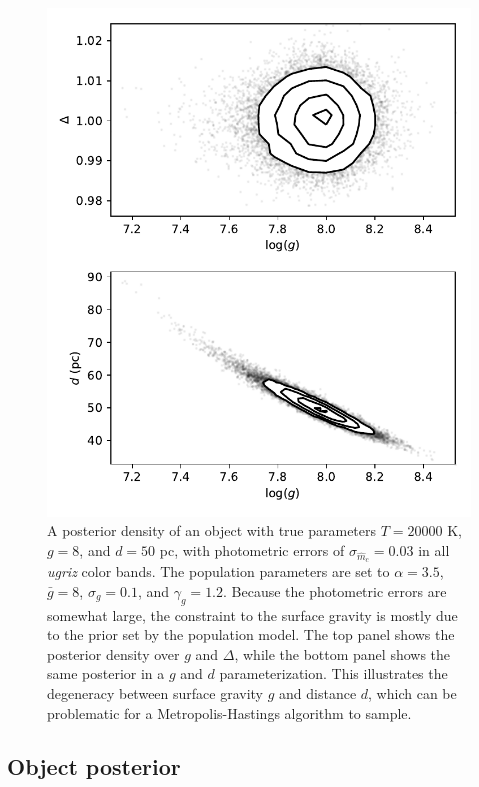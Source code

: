 \documentclass[fleqn,usenatbib]{mnras}
\newcommand{\Teff}{T}
\newcommand{\logg}{g}
\begin{document}
\begin{figure}
	\includegraphics[width=\columnwidth]{banana.pdf}
    \caption{A posterior density of an object with true parameters $\Teff=20000$ K, $\logg=8$, and $d=50$ pc, with photometric errors of $\sigma_{\hat{m}_c}=0.03$ in all \emph{ugriz} color bands. The population parameters are set to $\alpha=3.5$, $\bar{g}=8$, $\sigma_g=0.1$, and $\gamma_g=1.2$. Because the photometric errors are somewhat large, the constraint to the surface gravity is mostly due to the prior set by the population model. The top panel shows the posterior density over $\logg$ and $\Delta$, while the bottom panel shows the same posterior in a $\logg$ and $d$ parameterization. This illustrates the degeneracy between surface gravity $\logg$ and distance $d$, which can be problematic for a Metropolis-Hastings algorithm to sample.}
    \label{fig:banana}
\end{figure}



\subsection{Object posterior}\label{sec:objectposterior}
\end{document}
